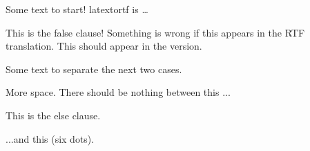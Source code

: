 \documentclass[11pt]{report}
\newif\iflatextortf  %
\begin{document}
Some text to start! latextortf is \ldots

\iflatextortf

  This is the true clause!  There should be no false clause.

\else

  This is the false clause!  Something is wrong if this appears in the RTF translation.
  This should appear in the \latex{} version.

\fi

Some text to separate the next two cases.

\iflatextortf

  No else clause!  This is the true clause.

\fi

More space.  There should be nothing between this ...
\iflatextortf

\else

  This is the else clause.

\fi
...and this (six dots).
\end{document}
